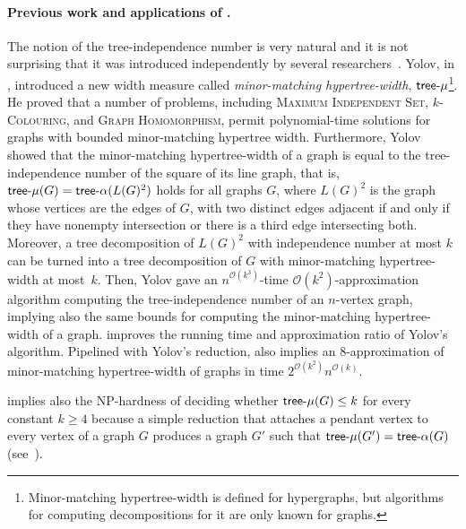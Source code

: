 \documentclass[11pt]{article}
\theoremstyle{definition}
\newcommand{\tin}{\mathsf{tree} \textnormal{-} \alpha}
\newcommand{\trmu}{\mathsf{tree} \textnormal{-} \mu}
\newcommand{\NP}{\textup{\textsf{NP}}}
\newcommand{\OO}{\mathcal{O}}
\begin{document}
\paragraph{Previous work and applications of  .}
The notion of the tree-independence number is very natural and it is not surprising that it was introduced independently by several researchers~\cite{DallardMS24,Yolov18}.
Yolov, in \cite{Yolov18}, introduced a new width measure called
\emph{minor-matching hypertree-width}, $\trmu$\footnote{Minor-matching hypertree-width is defined for hypergraphs, but algorithms for computing decompositions for it are only known for graphs.}.
He proved that a number of problems, including \textsc{Maximum Independent Set}, \textsc{$k$-Colouring}, and \textsc{Graph Homomorphism}, permit polynomial-time solutions for graphs with bounded minor-matching hypertree width.
Furthermore, Yolov showed that the minor-matching hypertree-width of a graph is equal to the tree-independence number of the square of its line graph, that is, $\trmu(G) = \tin(L(G)^2)$ holds for all graphs $G$, where $L(G)^2$ is the graph whose vertices are the edges of $G$, with two distinct edges adjacent if and only if they have nonempty intersection or there is a third edge intersecting both.
Moreover, a tree decomposition of $L(G)^2$ with independence number at most $k$ can be turned into a tree decomposition of $G$ with minor-matching hypertree-width at most~$k$.
Then, Yolov gave an $n^{\OO(k^3)}$-time $\OO(k^2)$-approximation algorithm computing the tree-independence number of an $n$-vertex graph, implying also the same bounds for computing the minor-matching hypertree-width of a graph.
 improves the running time and approximation ratio of Yolov's algorithm. Pipelined with Yolov's reduction,   also implies an $8$-approximation of minor-matching hypertree-width of graphs in time $2^{\OO(k^2)} n^{\OO(k)}$.


 implies also the \NP-hardness of deciding whether $\trmu(G) \le k$ for every constant $k \ge 4$ because a simple reduction that attaches a pendant vertex to every vertex of a graph $G$ produces  a graph $G'$ such that $\trmu(G') = \tin(G)$ (see~\cite{Yolov18}).
\end{document}
